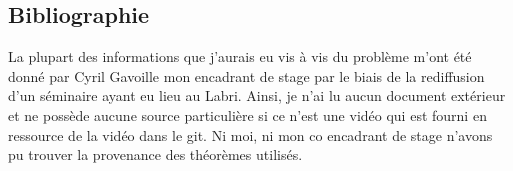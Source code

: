 \subsection{Bibliographie}

La plupart des informations que j'aurais eu vis à vis du problème m'ont été donné par Cyril Gavoille mon encadrant de stage par le biais de la rediffusion d'un séminaire ayant eu lieu au Labri. Ainsi, je n'ai lu aucun document extérieur et ne possède aucune source particulière si ce n'est une vidéo qui est fourni en ressource de la vidéo dans le git. Ni moi, ni mon co encadrant de stage n'avons pu trouver la provenance des théorèmes utilisés.